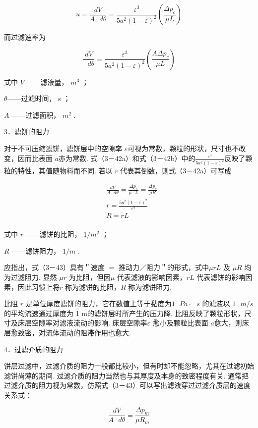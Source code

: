 \documentclass[
]{article}
\begin{document}
\[u = \frac{dV}{A\text{\ }d\theta} = \frac{\varepsilon^{3}}{5a^{2}(1 - \varepsilon)^{2}}\left( \frac{\Delta p_{c}}{\mu L} \right)\]

而过滤速率为

\[\frac{dV}{\text{\ }d\theta} = \frac{\varepsilon^{3}}{5a^{2}(1 - \varepsilon)^{2}}\left( \frac{A\Delta p_{c}}{\mu L} \right)\]

式中 \(V\) ------滤液量， \(m^{3}\) ；

\(\theta\)------过滤时间， s ；

\(A\) ------过滤面积， \(m^{2}\) . 

3．滤饼的阻力

对于不可压缩滤饼，滤饼层中的空隙率 \(\varepsilon\)可视为常数，颗粒的形状，尺寸也不改变，因而比表面 \(a\)亦为常数. 式（3－42a）和式（3－42b）中的\(\frac{\varepsilon^{3}}{5a^{2}(1 - \varepsilon)^{2}}\)反映了颗粒的特性，其值随物料而不同. 若以 \(r\)
代表其倒数，则式（3－42a）可写成

\[\begin{matrix}
 & \frac{dV}{A\text{\ }d\theta} = \frac{\Delta p_{c}}{\mu\text{\ }L} = \frac{\Delta p_{c}}{\mu R} \\
 & r = \frac{5a^{2}(1 - \varepsilon)^{2}}{\varepsilon^{3}} \\
 & R = rL \\
\end{matrix}\]

式中 \(r\) ------滤饼的比阻， \(1/m^{2}\) ；

\(R\) ------滤饼阻力， \(1/m\) . 

应指出，式（3－43）具有＂速度 \(=\) 推动力／阻力＂的形式，式中\(\mu rL\) 及 \(\mu R\) 均为过滤阻力. 显然 \(\mu r\) 为比阻，但因\(\mu\) 代表滤液的影响因素，\(rL\) 代表滤饼的影响因素，因此习惯上将\(r\) 称为滤饼的比阻，\(R\) 称为滤饼阻力. 

比阻 \(r\) 是单位厚度滤饼的阻力，它在数值上等于黏度为\(1\text{\ }Pa \cdot \text{\ }s\) 的滤液以 \(1\text{\ }m/s\)的平均流速通过厚度为 1 m的滤饼层时所产生的压力降. 比阻反映了颗粒形状，尺寸及床层空隙率对滤液流动的影响. 床层空隙率\(\varepsilon\) 愈小及颗粒比表面 \(a\)愈大，则床层愈致密，对流体流动的阻滞作用也愈大. 

4．过滤介质的阻力

饼层过滤中，过滤介质的阻力一般都比较小，但有时却不能忽略，尤其在过滤初始滤饼尚薄的期间. 过滤介质的阻力当然也与其厚度及本身的致密程度有关. 通常把过滤介质的阻力视为常数，仿照式（3－43）可以写出滤液穿过过滤介质层的速度关系式：

\[\frac{dV}{A\text{\ }d\theta} = \frac{\Delta p_{m}}{\mu R_{m}}\]
\end{document}
